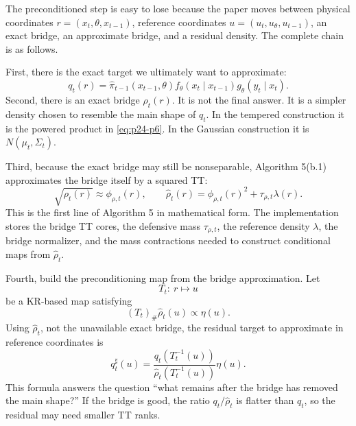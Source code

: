 \documentclass[11pt]{article}
\numberwithin{equation}{section}
\begin{document}
The preconditioned step is easy to lose because the paper moves between
physical coordinates \(r=(x_t,\theta,x_{t-1})\), reference coordinates
\(u=(u_t,u_\theta,u_{t-1})\), an exact bridge, an approximate bridge, and a
residual density.  The complete chain is as follows.

First, there is the exact target we ultimately want to approximate:
\begin{equation}
    q_t(r)
    =
    \widehat\pi_{t-1}(x_{t-1},\theta)
    f_\theta(x_t\mid x_{t-1})
    g_\theta(y_t\mid x_t).
    \label{eq:p24-p7a}
\end{equation}
Second, there is an exact bridge \(\rho_t(r)\).  It is not the final answer.
It is a simpler density chosen to resemble the main shape of \(q_t\).  In the
tempered construction it is the powered product in \eqref{eq:p24-p6}.  In the Gaussian
construction it is \(N(\mu_t,\Sigma_t)\).

Third, because the exact bridge may still be nonseparable, Algorithm 5(b.1)
approximates the bridge itself by a squared TT:
\begin{equation}
    \sqrt{\rho_t(r)}\approx \phi_{\rho,t}(r),
    \qquad
    \widehat\rho_t(r)
    =
    \phi_{\rho,t}(r)^2+\tau_{\rho,t}\lambda(r).
    \label{eq:p24-p7b}
\end{equation}
This is the first line of Algorithm 5 in mathematical form.  The implementation
stores the bridge TT cores, the defensive mass \(\tau_{\rho,t}\), the reference
density \(\lambda\), the bridge normalizer, and the mass contractions needed to
construct conditional maps from \(\widehat\rho_t\).

Fourth, build the preconditioning map from the bridge approximation.  Let
\begin{equation}
    T_t:\ r\mapsto u
    \label{eq:p24-p7c}
\end{equation}
be a KR-based map satisfying
\begin{equation}
    (T_t)_\#\widehat\rho_t(u)\propto \eta(u).
    \label{eq:p24-p7d}
\end{equation}
Using \(\widehat\rho_t\), not the unavailable exact bridge, the residual target
to approximate in reference coordinates is
\begin{equation}
    q_t^\sharp(u)
    =
    \frac{q_t(T_t^{-1}(u))}
    {\widehat\rho_t(T_t^{-1}(u))}
    \eta(u).
    \label{eq:p24-p7e}
\end{equation}
This formula answers the question ``what remains after the bridge has removed
the main shape?''  If the bridge is good, the ratio \(q_t/\widehat\rho_t\) is
flatter than \(q_t\), so the residual may need smaller TT ranks.
\end{document}
